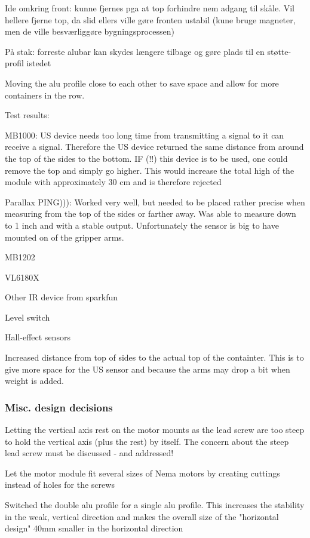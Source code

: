 \documentclass{sigchi}
\begin{document}
		Ide omkring front: kunne fjernes pga at top forhindre nem adgang til skåle. Vil hellere fjerne top, da slid ellers ville gøre fronten ustabil (kune bruge magneter, men de ville besværliggøre bygningsprocessen)
		
		På stak: forreste alubar kan skydes længere tilbage og gøre plads til en støtte-profil istedet
		
		Moving the alu profile close to each other to save space and allow for more containers in the row.
		
		
		
		Test results:
		
			MB1000: US device needs too long time from transmitting a signal to it can receive a signal. Therefore the US device returned the same distance  from around the top of the sides to the bottom.
			IF (!!) this device is to be used, one could remove the top and simply go higher. This would increase the total high of the module with approximately 30 cm and is therefore rejected
			
			Parallax PING))): Worked very well, but needed to be placed rather precise when measuring from the top of the sides or farther away. 
			Was able to measure down to 1 inch and with a stable output.
			Unfortunately the sensor is big to have mounted on of the gripper arms.
			
			MB1202
			
			VL6180X
			
			Other IR device from sparkfun
			
			Level switch
			
			Hall-effect sensors
			
		Increased distance from top of sides to the actual top of the containter. This is to give more space for the US sensor and because the arms may drop a bit when weight is added.
			
		
		\subsubsection{Misc. design decisions}
		Letting the vertical axis rest on the motor mounts as the lead screw are too steep to hold the vertical axis (plus the rest) by itself.
		The concern about the steep lead screw must be discussed - and addressed!
		
		
		Let the motor module fit several sizes of Nema motors by creating cuttings instead of holes for the screws
		
		Switched the double alu profile for a single alu profile. This increases the stability in the weak, vertical direction and makes the overall size of the "horizontal design" 40mm smaller in the horizontal direction
		
\end{document}
